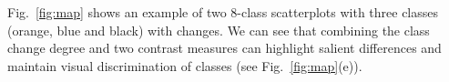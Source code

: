 Fig.~\ref{fig:map} shows an example of two 8-class scatterplots with three classes (orange, blue and black) with changes. We can see that combining the class change degree and two contrast measures can highlight salient differences and maintain visual discrimination of classes (see Fig.~\ref{fig:map}(e)).
